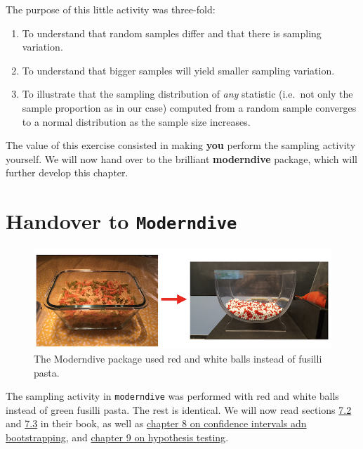 \documentclass[]{book}
\providecommand{\tightlist}{%
  \setlength{\itemsep}{0pt}\setlength{\parskip}{0pt}}
\newenvironment{note}{\begin{tcolorbox}[colback=blue!5!white,colframe=blue!75!black]}{\end{tcolorbox}}
\begin{document}
The purpose of this little activity was three-fold:

\begin{enumerate}
\def\labelenumi{\arabic{enumi}.}
\tightlist
\item
  To understand that random samples differ and that there is sampling
  variation.
\item
  To understand that bigger samples will yield smaller sampling
  variation.
\item
  To illustrate that the sampling distribution of \emph{any} statistic
  (i.e.~not only the sample proportion as in our case) computed from a
  random sample converges to a normal distribution as the sample size
  increases.
\end{enumerate}

\begin{note}
The value of this exercise consisted in making \textbf{you} perform the
sampling activity yourself. We will now hand over to the brilliant
\textbf{moderndive} package, which will further develop this chapter.
\end{note}

\section{\texorpdfstring{Handover to
\texttt{Moderndive}}{Handover to Moderndive}}\label{handover-to-moderndive}

\begin{figure}
\includegraphics[width=0.9\linewidth]{images/transition} \caption{The Moderndive package used red and white balls instead of fusilli pasta.}\label{fig:handover}
\end{figure}

The sampling activity in \texttt{moderndive} was performed with red and
white balls instead of green fusilli pasta. The rest is identical. We
will now read sections
\href{https://moderndive.com/7-sampling.html\#sampling-simulation}{7.2}
and
\href{https://moderndive.com/7-sampling.html\#sampling-framework}{7.3}
in their book, as well as
\href{https://moderndive.com/8-confidence-intervals.html}{chapter 8 on
confidence intervals adn bootstrapping}, and
\href{https://moderndive.com/9-hypothesis-testing.html}{chapter 9 on
hypothesis testing}.
\end{document}
